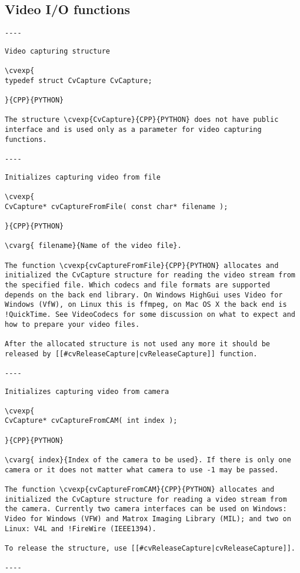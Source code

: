 \subsection{Video I/O functions}
\begin{verbatim}
----
\end{verbatim}
\begin{verbatim}
Video capturing structure

\cvexp{
typedef struct CvCapture CvCapture;

}{CPP}{PYTHON}

The structure \cvexp{CvCapture}{CPP}{PYTHON} does not have public interface and is used only as a parameter for video capturing functions.

----
\end{verbatim}
\begin{verbatim}
Initializes capturing video from file

\cvexp{
CvCapture* cvCaptureFromFile( const char* filename );

}{CPP}{PYTHON}

\cvarg{ filename}{Name of the video file}.

The function \cvexp{cvCaptureFromFile}{CPP}{PYTHON} allocates and initialized the CvCapture structure for reading the video stream from the specified file. Which codecs and file formats are supported depends on the back end library. On Windows HighGui uses Video for Windows (VfW), on Linux this is ffmpeg, on Mac OS X the back end is !QuickTime. See VideoCodecs for some discussion on what to expect and how to prepare your video files.

After the allocated structure is not used any more it should be released by [[#cvReleaseCapture|cvReleaseCapture]] function.

----
\end{verbatim}
\begin{verbatim}
Initializes capturing video from camera

\cvexp{
CvCapture* cvCaptureFromCAM( int index );

}{CPP}{PYTHON}

\cvarg{ index}{Index of the camera to be used}. If there is only one camera or it does not matter what camera to use -1 may be passed.

The function \cvexp{cvCaptureFromCAM}{CPP}{PYTHON} allocates and initialized the CvCapture structure for reading a video stream from the camera. Currently two camera interfaces can be used on Windows: Video for Windows (VFW) and Matrox Imaging Library (MIL); and two on Linux: V4L and !FireWire (IEEE1394).

To release the structure, use [[#cvReleaseCapture|cvReleaseCapture]].

----
\end{verbatim}
